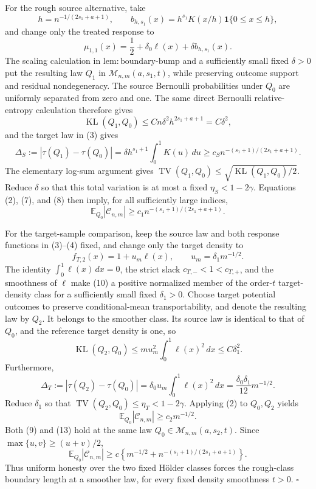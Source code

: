 For the rough source alternative, take
\[
 h=n^{-1/(2s_1+a+1)},
 \qquad
 b_{h,s_1}(x)=h^{s_1}K(x/h)\mathbf 1\{0\le x\le h\},
\tag{5}
\]
and change only the treated response to
\[
 \mu_{1,1}(x)=\frac12+\delta_0\ell(x)+\delta b_{h,s_1}(x).
\tag{6}
\]
The scaling calculation in \(\mathrm{lem:boundary\text{-}bump}\) and a sufficiently small fixed \(\delta>0\) put the resulting law \(Q_1\) in \(\mathcal M_{n,m}(a,s_1,t)\), while preserving outcome support and residual nondegeneracy.  The source Bernoulli probabilities under \(Q_0\) are uniformly separated from zero and one.  The same direct Bernoulli relative-entropy calculation therefore gives
\[
 \operatorname{KL}(Q_1,Q_0)
 \le Cn\delta^2h^{2s_1+a+1}
 =C\delta^2,
\tag{7}
\]
and the target law in (3) gives
\[
 \Delta_S:=|\tau(Q_1)-\tau(Q_0)|
 =\delta h^{s_1+1}\int_0^1K(u)\,du
 \ge c_Sn^{-(s_1+1)/(2s_1+a+1)}.
\tag{8}
\]
The elementary log-sum argument gives
\(\operatorname{TV}(Q_1,Q_0)\le\sqrt{\operatorname{KL}(Q_1,Q_0)/2}\).  Reduce \(\delta\) so that this total variation is at most a fixed
\(\eta_S<1-2\gamma\).  Equations (2), (7), and (8) then imply, for all sufficiently large indices,
\[
 \mathbb E_{Q_0}|\mathcal C_{n,m}|
 \ge c_1n^{-(s_1+1)/(2s_1+a+1)}.
\tag{9}
\]

For the target-sample comparison, keep the source law and both response functions in (3)--(4) fixed, and change only the target density to
\[
 f_{T,2}(x)=1+u_m\ell(x),
 \qquad u_m=\delta_1m^{-1/2}.
\tag{10}
\]
The identity \(\int_0^1\ell(x)\,dx=0\), the strict slack
\(c_{T,-}<1<c_{T,+}\), and the smoothness of \(\ell\) make (10) a positive normalized member of the order-\(t\) target-density class for a sufficiently small fixed \(\delta_1>0\).  Choose target potential outcomes to preserve conditional-mean transportability, and denote the resulting law by \(Q_2\).  It belongs to the smoother class.  Its source law is identical to that of \(Q_0\), and the reference target density is one, so
\[
 \operatorname{KL}(Q_2,Q_0)
 \le m u_m^2\int_0^1\ell(x)^2\,dx
 \le C\delta_1^2.
\tag{11}
\]
Furthermore,
\[
 \Delta_T:=|\tau(Q_2)-\tau(Q_0)|
 =\delta_0u_m\int_0^1\ell(x)^2\,dx
 =\frac{\delta_0\delta_1}{12}m^{-1/2}.
\tag{12}
\]
Reduce \(\delta_1\) so that
\(\operatorname{TV}(Q_2,Q_0)\le\eta_T<1-2\gamma\).  Applying (2) to \(Q_0,Q_2\) yields
\[
 \mathbb E_{Q_0}|\mathcal C_{n,m}|
 \ge c_2m^{-1/2}.
\tag{13}
\]
Both (9) and (13) hold at the same law
\(Q_0\in\mathcal M_{n,m}(a,s_2,t)\).  Since
\(\max\{u,v\}\ge(u+v)/2\),
\[
 \mathbb E_{Q_0}|\mathcal C_{n,m}|
 \ge c\left\{m^{-1/2}
 +n^{-(s_1+1)/(2s_1+a+1)}\right\}.
\tag{14}
\]
Thus uniform honesty over the two fixed H\"older classes forces the rough-class boundary length at a smoother law, for every fixed density smoothness \(t>0\). \(\square\)